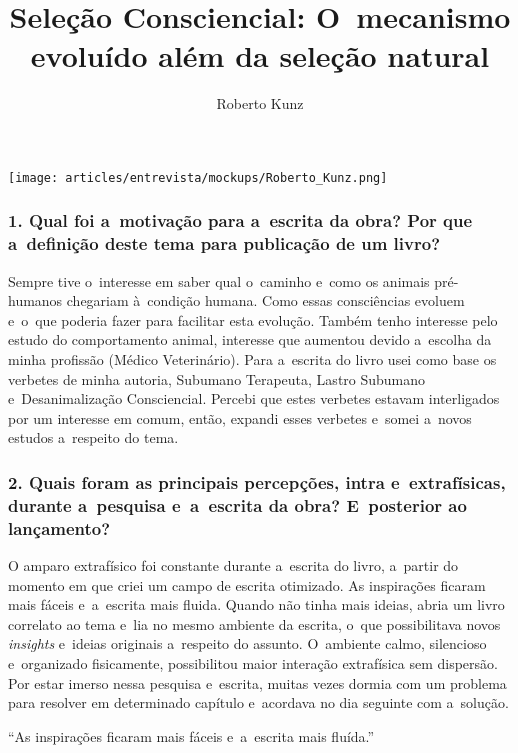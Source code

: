 \documentclass{gescons}
\author{Roberto Kunz}
\title{Seleção Consciencial: O~mecanismo evoluído além da seleção natural}
\begin{document}
    \makeentrevistatitle

    \begin{multicols}{2}

\begin{center}
    \texttt{[image: articles/entrevista/mockups/Roberto\_Kunz.png]}
\end{center}


\subsubsection{1. Qual foi a~motivação para a~escrita da obra? Por que a~definição deste tema para publicação de um livro?}

Sempre tive o~interesse em saber qual o~caminho e~como os animais pré-humanos chegariam à~condição humana. Como essas consciências evoluem e~o~que poderia fazer para facilitar esta evolução. Também tenho interesse pelo estudo do comportamento animal, interesse que aumentou devido a~escolha da minha profissão (Médico Veterinário). Para a~escrita do livro usei como base os verbetes de minha autoria, Subumano Terapeuta, Lastro Subumano e~Desanimalização Consciencial. Percebi que estes verbetes estavam interligados por um interesse em comum, então, expandi esses verbetes e~somei a~novos estudos a~respeito do tema.

\subsubsection{2. Quais foram as principais percepções, intra e~extrafísicas, durante a~pesquisa e~a~escrita da obra? E~posterior ao lançamento?}

O amparo extrafísico foi constante durante a~escrita do livro, a~partir do momento em que criei um campo de escrita otimizado. As inspirações ficaram mais fáceis e~a~escrita mais fluida. Quando não tinha mais ideias, abria um livro correlato ao tema e~lia no mesmo ambiente da escrita, o~que possibilitava novos \emph{insights} e~ideias originais a~respeito do assunto. O~ambiente calmo, silencioso e~organizado fisicamente, possibilitou maior interação extrafísica sem dispersão. Por estar imerso nessa pesquisa e~escrita, muitas vezes dormia com um problema para resolver em determinado capítulo e~acordava no dia seguinte com a~solução.

\begin{pullquote}
    ``As inspirações ficaram mais fáceis e~a~escrita mais fluída.''
\end{pullquote}


\end{multicols}
\end{document}
